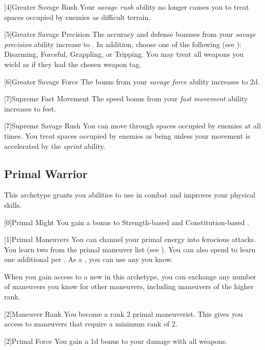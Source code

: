         [4]{Greater Savage Rush} Your \textit{savage rush} ability no longer causes you to treat spaces occupied by enemies as difficult terrain.

        [5]{Greater Savage Precision} The accuracy and defense bonuses from your \textit{savage precision} ability increase to .
        In addition, choose one of the following  (see ): Disarming, Forceful, Grappling, or Tripping.
        You may treat all weapons you wield as if they had the chosen weapon tag.

        [6]{Greater Savage Force} The bonus from your \textit{savage force} ability increases to \plus2d.

        [7]{Supreme Fast Movement} The speed bonus from your \textit{fast movement} ability increases to  feet.

        [7]{Supreme Savage Rush} You can move through spaces occupied by enemies at all times.
        You treat spaces occupied by enemies as being  unless your movement is accelerated by the \textit{sprint} ability.

    \newpage
    \subsection{Primal Warrior}
        This archetype grants you abilities to use in combat and improves your physical skills.

        [0]{Primal Might} You gain a  bonus to Strength-based  and Constitution-based .

        {
            [1]{Primal Maneuvers}
            You can channel your primal energy into ferocious attacks.
            You learn two  from the primal maneuver list (see ).
            You can also spend  to learn one additional  per .
            As a , you can use any  you know.

            When you gain access to a new  in this archetype,
                you can exchange any number of maneuvers you know for other maneuvers,
                including maneuvers of the higher rank.
        }

        {
            [2]{Maneuver Rank} You become a rank 2 primal maneuverist.
            This gives you access to maneuvers that require a minimum rank of 2.

            [2]{Primal Force} You gain a \plus1d bonus to your damage with all weapons.
        }

